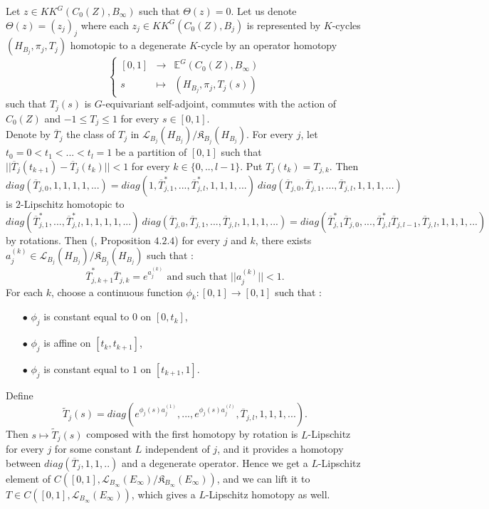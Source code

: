 \begin{dem}
Let $z\in KK^G(C_0(Z),B_\infty)$ such that $\Theta(z) = 0$. Let us denote $\Theta(z) = (z_j)_j$ where each $z_j\in KK^G(C_0(Z),B_j)$ is represented by $K$-cycles $(H_{B_j}, \pi_j,T_j)$ homotopic to a degenerate $K$-cycle by an operator homotopy 
\[\left\{\begin{array}{rcl} [0,1] & \rightarrow & \mathbb E^G(C_0(Z),B_\infty)\\ s & \mapsto & (H_{B_j}, \pi_j,T_j(s))\end{array}\right.\] 
such that $T_j(s)$ is $G$-equivariant self-adjoint, commutes with the action of $C_0(Z)$ and $-1\leq T_j \leq 1$ for every $s\in [0,1]$.\\

Denote by $\overline T_j$ the class of $T_j$ in $\mathcal L_{B_j}(H_{B_j})/ {\mathfrak K}_{B_j}(H_{B_j})$. For every $j$, let $t_0=0< t_1 < ... < t_l=1$ be a partition of $[0,1]$ such that $||\overline{T}_j(t_{k+1})-\overline{T}_j(t_k)||< 1$ for every $k\in\{0,..,l-1\}$. Put $T_j(t_k) = T_{j,k}$. Then 
\[diag(\overline{T}_{j,0},1,1,1,1,...)= diag(1,\overline{T}_{j,1}^*,...,\overline{T}_{j,l}^*,1,1,1,...) \ diag(\overline{T}_{j,0},\overline{T}_{j,1},...,\overline{T}_{j,l},1,1,1,...)\]
is $2$-Lipschitz homotopic to 
\[diag(\overline{T}_{j,1}^*,...,\overline{T}_{j,l}^*,1,1,1,1,...) \ diag(\overline{T}_{j,0},\overline{T}_{j,1},...,\overline{T}_{j,l},1,1,1,...)=diag(\overline{T}_{j,1}^*\overline{T}_{j,0} ,..., \overline{T}_{j,l}^*\overline{T}_{j,l-1},\overline{T}_{j,l},1,1,1,...) \] %
by rotations. Then (\cite{WeggeOlsen}, Proposition $4.2.4$) for every $j$ and $k$, there exists $a_j^{(k)}\in \mathcal L_{B_j}(H_{B_j})/ {\mathfrak K}_{B_j}(H_{B_j})$ such that :
\[\overline{T}_{j,k+1}^*\overline{T}_{j,k}=e^{ a_j^{(k)}} \text{ and such that } ||a_j^{(k)}||<1.\] 
For each $k$, choose a continuous function $\phi_k : [0,1]\rightarrow [0,1]$ such that :\\
\begin{itemize}
\item[$\bullet$] $\phi_j $ is constant equal to $0$ on $[0,t_k ]$,
\item[$\bullet$] $\phi_j$ is affine on $[t_k,t_{k+1}]$,
\item[$\bullet$] $\phi_j $ is constant equal to $1$ on $[t_{k+1},1 ]$.\\
\end{itemize}
Define
\[\tilde T_j(s) = diag(e^{\phi_j(s) a_j^{(1)}},..., e^{\phi_j(s) a_j^{(l)}},\overline{T}_{j,l},1,1,1,...).\] 
Then $s\mapsto \tilde T_j(s)$ composed with the first homotopy by rotation is $L$-Lipschitz for every $j$ for some constant $L$ independent of $j$, and it provides a homotopy between $diag(\overline{T}_j,1,1,..)$ and a degenerate operator. Hence we get a $L$-Lipschitz element of $C([0,1],\mathcal L_{B_\infty}(E_\infty)/\mathfrak K_{B_\infty}(E_\infty))$, and we can lift it to $T\in C([0,1],\mathcal L_{B_\infty}(E_\infty))$, which gives a $L$-Lipschitz homotopy as well. \\


\end{dem}
